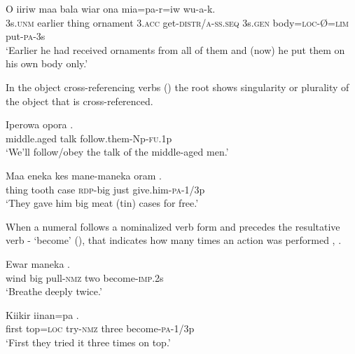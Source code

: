 \ea%
\label{ex:6:x1302}
\gll O  iiriw  maa  bala  wiar   ona  mia=pa-r=iw  wu-a-k.\\
3s.\textsc{unm}  earlier  thing  ornament  3.\textsc{acc}  get-\textsc{distr}/\textsc{a}-\textsc{ss}.\textsc{seq} 3s.\textsc{gen}  body=\textsc{loc}-{\O}=\textsc{lim}  put-\textsc{pa}-3s\\
\glt `Earlier he had received ornaments from all of them and (now) he put them on his own body only.'
\z

In the object cross-referencing verbs () the root shows singularity  or plurality  of the object that is cross-referenced.

\ea%
\label{ex:6:x1303}
\gll Iperowa  opora  . \\
middle.aged  talk  follow.them-Np-\textsc{fu}.1p\\
\glt `We'll follow/obey the talk of the middle-aged men.'
\z

\ea%
\label{ex:6:x1304}
\gll Maa  eneka  kes  mane-maneka  oram  . \\
thing  tooth  case  \textsc{rdp}-big  just  give.him-\textsc{pa}-1/3p\\
\glt `They gave him big meat (tin) cases for free.'
\z

When a numeral follows a nominalized verb form and precedes the resultative verb - `become' (), that indicates how many times an action was performed , . 

\ea%
\label{ex:6:x1305}
\gll Ewar  maneka      . \\
wind  big  pull-\textsc{nmz}  two  become-\textsc{imp}.2s\\
\glt `Breathe deeply twice.'
\z

\ea%
\label{ex:6:x1306}
\gll Kiikir  iinan=pa     . \\
first  top=\textsc{loc}  try-\textsc{nmz}  three  become-\textsc{pa}-1/3p\\
\glt `First they tried it three times on top.'
\z

